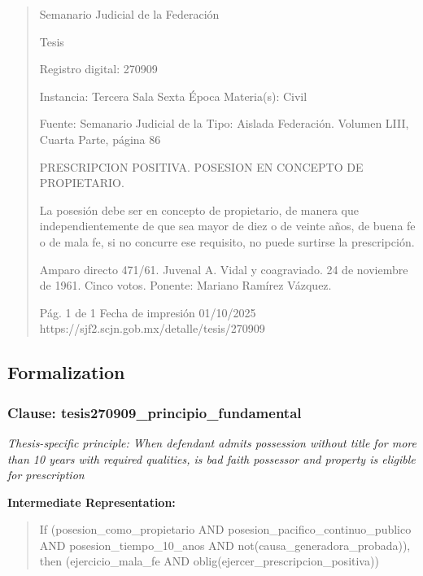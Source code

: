 \documentclass[11pt,a4paper]{article}
\begin{document}
\begin{quote}
                                                   Semanario Judicial de la Federación

                                                  Tesis

 Registro digital: 270909

 Instancia: Tercera Sala          Sexta Época                          Materia(s): Civil

                                  Fuente: Semanario Judicial de la     Tipo: Aislada
                                  Federación.
                                  Volumen LIII, Cuarta Parte, página
                                  86


PRESCRIPCION POSITIVA. POSESION EN CONCEPTO DE PROPIETARIO.


La posesión debe ser en concepto de propietario, de manera que independientemente de que sea
mayor de diez o de veinte años, de buena fe o de mala fe, si no concurre ese requisito, no puede
surtirse la prescripción.


Amparo directo 471/61. Juvenal A. Vidal y coagraviado. 24 de noviembre de 1961. Cinco votos.
Ponente: Mariano Ramírez Vázquez.




                                             Pág. 1 de 1           Fecha de impresión 01/10/2025
  https://sjf2.scjn.gob.mx/detalle/tesis/270909

\end{quote}

\subsection{Formalization}

\subsubsection{Clause: tesis270909\_principio\_fundamental}

\textit{Thesis-specific principle: When defendant admits possession without title for more than 10 years with required qualities, is bad faith possessor and property is eligible for prescription}

\textbf{Intermediate Representation:}

\begin{quote}
If (posesion\_como\_propietario AND posesion\_pacifico\_continuo\_publico AND posesion\_tiempo\_10\_anos AND not(causa\_generadora\_probada)), then (ejercicio\_mala\_fe AND oblig(ejercer\_prescripcion\_positiva))
\end{quote}
\end{document}
